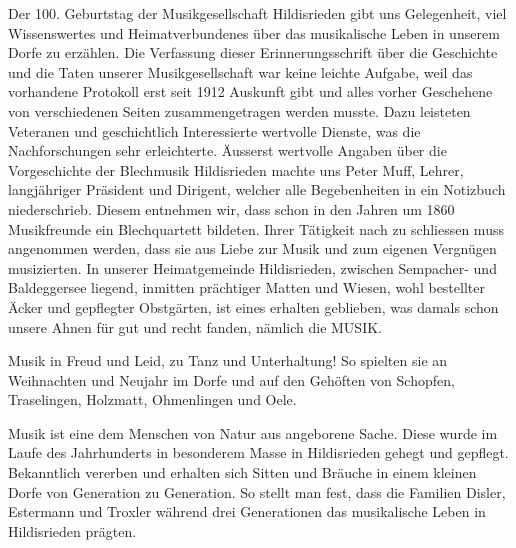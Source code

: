 \begin{history}

    Der 100. Geburtstag der Musikgesellschaft Hildisrieden gibt uns Gelegenheit,
    viel Wissenswertes und Heimatverbundenes über das musikalische Leben in
    unserem Dorfe zu erzählen. Die Verfassung dieser Erinnerungsschrift über die
    Geschichte und die Taten unserer Musikgesellschaft war keine leichte
    Aufgabe, weil das vorhandene Protokoll erst seit 1912 Auskunft gibt und
    alles vorher Geschehene von verschiedenen Seiten zusammengetragen werden
    musste. Dazu leisteten Veteranen und geschichtlich Interessierte wertvolle
    Dienste, was die Nachforschungen sehr erleichterte. Äusserst wertvolle
    Angaben über die Vorgeschichte der Blechmusik Hildisrieden machte uns Peter
    Muff, Lehrer, langjähriger Präsident und Dirigent, welcher alle
    Begebenheiten in ein Notizbuch niederschrieb. Diesem entnehmen wir, dass
    schon in den Jahren um 1860 Musikfreunde ein Blechquartett bildeten. Ihrer
    Tätigkeit nach zu schliessen muss angenommen werden, dass sie aus Liebe zur
    Musik und zum eigenen Vergnügen musizierten. In unserer Heimatgemeinde
    Hildisrieden, zwischen Sempacher- und Baldeggersee liegend, inmitten
    prächtiger Matten und Wiesen, wohl bestellter Äcker und gepflegter
    Obstgärten, ist eines erhalten geblieben, was damals schon unsere Ahnen für
    gut und recht fanden, nämlich die MUSIK.

    Musik in Freud und Leid, zu Tanz und Unterhaltung! So spielten sie an
    Weihnachten und Neujahr im Dorfe und auf den Gehöften von Schopfen,
    Traselingen, Holzmatt, Ohmenlingen und Oele.

    Musik ist eine dem Menschen von Natur aus angeborene Sache. Diese wurde im
    Laufe des Jahrhunderts in besonderem Masse in Hildisrieden gehegt und
    gepflegt. Bekanntlich vererben und erhalten sich Sitten und Bräuche in einem
    kleinen Dorfe von Generation zu Generation. So stellt man fest, dass die
    Familien Disler, Estermann und Troxler während drei Generationen das
    musikalische Leben in Hildisrieden prägten.

\end{history}
